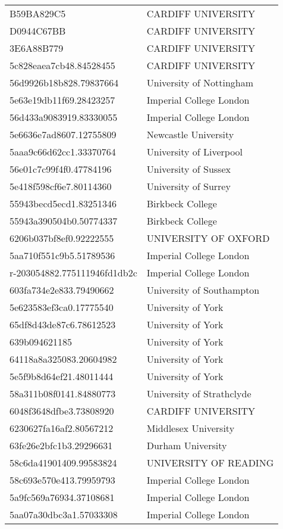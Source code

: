 \begin{tabular}{ll}
B59BA829C5 & CARDIFF UNIVERSITY \\
D0944C67BB & CARDIFF UNIVERSITY \\
3E6A88B779 & CARDIFF UNIVERSITY \\
5c828eaea7cb48.84528455 & CARDIFF UNIVERSITY \\
56d9926b18b828.79837664 & University of Nottingham \\
5e63e19db11f69.28423257 & Imperial College London \\
56d433a9083919.83330055 & Imperial College London \\
5e6636e7ad8607.12755809 & Newcastle University \\
5aaa9c66d62cc1.33370764 & University of Liverpool \\
56e01c7c99f4f0.47784196 & University of Sussex \\
5e418f598cf6e7.80114360 & University of Surrey \\
55943becd5ecd1.83251346 & Birkbeck College \\
55943a390504b0.50774337 & Birkbeck College \\
6206b037bf8ef0.92222555 & UNIVERSITY OF OXFORD \\
5aa710f551c9b5.51789536 & Imperial College London \\
r-203054882.775111946fd1db2c & Imperial College London \\
603fa734e2e833.79490662 & University of Southampton \\
5e623583ef3ca0.17775540 & University of York \\
65df8d43de87c6.78612523 & University of York \\
639b094621185 & University of York \\
64118a8a325083.20604982 & University of York \\
5e5f9b8d64ef21.48011444 & University of York \\
58a311b08f0141.84880773 & University of Strathclyde \\
6048f3648dfbe3.73808920 & CARDIFF UNIVERSITY \\
6230627fa16af2.80567212 & Middlesex University \\
63fe26e2bfc1b3.29296631 & Durham University \\
58c6da41901409.99583824 & UNIVERSITY OF READING \\
58c693e570e413.79959793 & Imperial College London \\
5a9fc569a76934.37108681 & Imperial College London \\
5aa07a30dbc3a1.57033308 & Imperial College London \\

\end{tabular}
